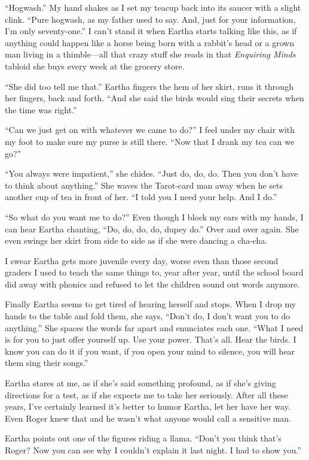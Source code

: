 \documentclass[
]{article}
\begin{document}
``Hogwash.'' My hand shakes as I set my teacup back into its saucer with
a slight clink. ``Pure hogwash, as my father used to say. And, just for
your information, I'm only seventy-one.'' I can't stand it when Eartha
starts talking like this, as if anything could happen like a horse being
born with a rabbit's head or a grown man living in a thimble---all that
crazy stuff she reads in that \emph{Enquiring Minds} tabloid she buys
every week at the grocery store.

``She did too tell me that.'' Eartha fingers the hem of her skirt, runs
it through her fingers, back and forth. ``And she said the birds would
sing their secrets when the time was right.''

``Can we just get on with whatever we came to do?'' I feel under my
chair with my foot to make sure my purse is still there. ``Now that I
drank my tea can we go?''

``You always were impatient,'' she chides. ``Just do, do, do. Then you
don't have to think about anything.'' She waves the Tarot-card man away
when he sets another cup of tea in front of her. ``I told you I need
your help. And I do.''

``So what do you want me to do?'' Even though I block my ears with my
hands, I can hear Eartha chanting, ``Do, do, do, do, dupey do.'' Over
and over again. She even swings her skirt from side to side as if she
were dancing a cha-cha.

I swear Eartha gets more juvenile every day, worse even than those
second graders I used to teach the same things to, year after year,
until the school board did away with phonics and refused to let the
children sound out words anymore.

Finally Eartha seems to get tired of hearing herself and stops. When I
drop my hands to the table and fold them, she says, ``Don't do, I don't
want you to do anything.'' She spaces the words far apart and enunciates
each one. ``What I need is for you to just offer yourself up. Use your
power. That's all. Hear the birds. I know you can do it if you want, if
you open your mind to silence, you will hear them sing their songs.''

Eartha stares at me, as if she's said something profound, as if she's
giving directions for a test, as if she expects me to take her
seriously. After all these years, I've certainly learned it's better to
humor Eartha, let her have her way. Even Roger knew that and he wasn't
what anyone would call a sensitive man.

Eartha points out one of the figures riding a llama. ``Don't you think
that's Roger? Now you can see why I couldn't explain it last night. I
had to show you.''
\end{document}
